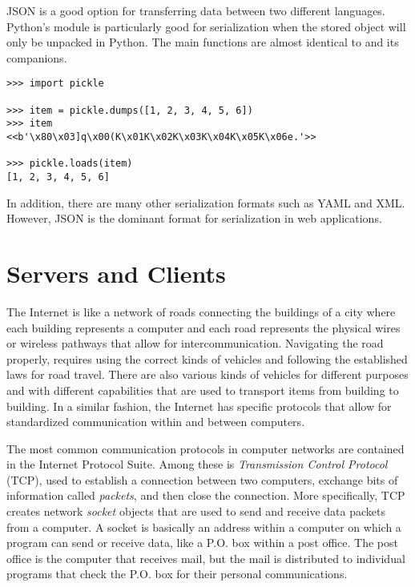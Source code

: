 \begin{info} %
JSON is a good option for transferring data between two different languages.
Python's  module is particularly good for serialization when the stored object will only be unpacked in Python.
The main functions are almost identical to  and its companions.

\begin{lstlisting}
>>> import pickle

>>> item = pickle.dumps([1, 2, 3, 4, 5, 6])
>>> item
<<b'\x80\x03]q\x00(K\x01K\x02K\x03K\x04K\x05K\x06e.'>>

>>> pickle.loads(item)
[1, 2, 3, 4, 5, 6]
\end{lstlisting}

In addition, there are many other serialization formats such as YAML and XML.
However, JSON is the dominant format for serialization in web applications.
\end{info}

\section*{Servers and Clients} %

The Internet is like a network of roads connecting the buildings of a city where each building represents a computer and each road represents the physical wires or wireless pathways that allow for intercommunication.
Navigating the road properly, requires using the correct kinds of vehicles and following the established laws for road travel.
There are also various kinds of vehicles for different purposes and with different capabilities that are used to transport items from building to building.
In a similar fashion, the Internet has specific protocols that allow for standardized communication within and between computers.

The most common communication protocols in computer networks are contained in the Internet Protocol Suite.
Among these is \emph{Transmission Control Protocol} (TCP), used to establish a connection between two computers, exchange bits of information called \emph{packets}, and then close the connection.
More specifically, TCP creates network \emph{socket} objects that are used to send and receive data packets from a computer.
A socket is basically an address within a computer on which a program can send or receive data, like a P.O. box within a post office.
The post office is the computer that receives mail, but the mail is distributed to individual programs that check the P.O. box for their personal communications.

